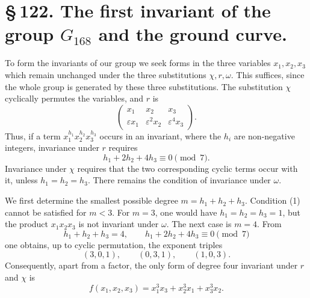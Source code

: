 \documentclass[11pt]{article}
\newcommand{\eps}{\varepsilon}
\newcommand{\mat}[1]{\begin{pmatrix}#1\end{pmatrix}}
\begin{document}
\section*{\S\,122. The first invariant of the group \(G_{168}\) and the ground curve.}

To form the invariants of our group we seek forms in the three variables \(x_1,x_2,x_3\) which remain unchanged under the three substitutions \(\chi,r,\omega\). This suffices, since the whole group is generated by these three substitutions. The substitution \(\chi\) cyclically permutes the variables, and \(r\) is
\begin{equation}
\mat{x_1&x_2&x_3\\ \eps x_1&\eps^2x_2&\eps^4x_3}.
\end{equation}
Thus, if a term \(x_1^{h_1}x_2^{h_2}x_3^{h_3}\) occurs in an invariant, where the \(h_i\) are non-negative integers, invariance under \(r\) requires
\begin{equation}
h_1+2h_2+4h_3\equiv0\pmod 7.
\tag{1}
\end{equation}
Invariance under \(\chi\) requires that the two corresponding cyclic terms occur with it, unless \(h_1=h_2=h_3\). There remains the condition of invariance under \(\omega\).

We first determine the smallest possible degree \(m=h_1+h_2+h_3\). Condition (1) cannot be satisfied for \(m<3\). For \(m=3\), one would have \(h_1=h_2=h_3=1\), but the product \(x_1x_2x_3\) is not invariant under \(\omega\). The next case is \(m=4\). From
\begin{equation}
h_1+h_2+h_3=4,
\qquad
h_1+2h_2+4h_3\equiv0\pmod 7
\end{equation}
one obtains, up to cyclic permutation, the exponent triples
\begin{equation}
(3,0,1),
\qquad (0,3,1),
\qquad (1,0,3).
\end{equation}
Consequently, apart from a factor, the only form of degree four invariant under \(r\) and \(\chi\) is
\begin{equation}
f(x_1,x_2,x_3)=x_1^3x_3+x_2^3x_1+x_3^3x_2.
\tag{2}
\end{equation}
\end{document}
